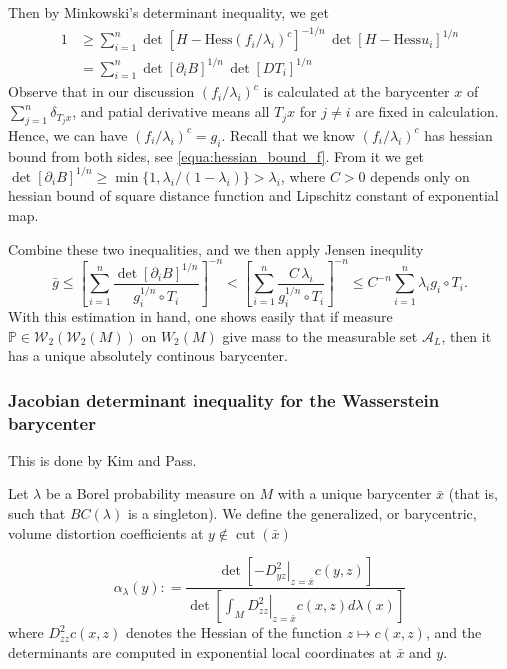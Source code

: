 Then by Minkowski's determinant inequality, we get
\begin{align*}
	1 & \geq \sum_{i=1}^{n} \det [H-\text{Hess}(f_i/\lambda_i)^c]^{-1/n}\,\det[H-\text{Hess}u_i]^{1/n} \\
	  & =\sum_{i=1}^n \det[\partial_i B]^{1/n}\,\det[DT_i]^{1/n}
\end{align*}
Observe that in our discussion $(f_i / \lambda_i)^c$ is calculated at the barycenter $x$ of $\sum_{j=1}^{n} \delta_{T_j x}$,
and patial derivative means all $T_j x$ for $ j \ne i$ are fixed in calculation.
Hence, we can have $(f_i / \lambda_i)^c = g_i$.
Recall that we know $(f_i / \lambda_i)^c$ has hessian bound from both sides, see \cref{equa:hessian_bound_f}.
From it we get $\det[\partial_i B]^{1/n} \geq \min \{1, \lambda_i / (1 - \lambda_i)\} > \lambda_i$,
where $C > 0$ depends only on hessian bound of square distance function and Lipschitz constant of exponential map.

Combine these two inequalities, and we then apply Jensen inequlity
\[
	\bar{g} \leq
	\left[ \sum_{i=1}^n \frac{\det[\partial_i B]^{1/n}}
	{g_i^{1/n} \circ T_i}\right]^{-n}
	< \left[ \sum_{i=1}^n \frac{C \, \lambda_i}
	{g_i^{1/n} \circ T_i}\right]^{-n}
	\leq C^{-n} \sum_{i=1}^n \lambda_i g_i \circ T_i.
\]
With this estimation in hand,
one shows easily that if measure $\mathbb{P} \in \mathcal{W}_2(\mathcal{W}_2(M))$ on $W_2(M)$ give mass to the measurable set $\mathcal{A}_L$,
then it has a unique absolutely continous barycenter.

\subsubsection{Jacobian determinant inequality for the Wasserstein barycenter}

This is done by Kim and Pass.
\begin{defn}
	Let \( \lambda \) be a Borel probability measure on \( M \) with a
	unique barycenter \( \bar { x } \) (that is, such that \( B C ( \lambda ) \) is a singleton). We define the generalized,
	or barycentric, volume distortion coefficients at \( y \notin \operatorname { cut } ( \bar { x } ) \)

	\[ \alpha _ { \lambda } ( y ) : = \frac { \operatorname { det } \left[ - \left. D _ { y z } ^ { 2 } \right| _ { z = \bar { x } } c ( y , z ) \right] } { \operatorname { det } \left[ \left. \int _ { M } D _ { z z } ^ { 2 } \right| _ { z = \bar { x } } c ( x , z ) d \lambda ( x ) \right] } \]
	where \( D _ { z z } ^ { 2 } c ( x , z ) \) denotes the Hessian of the function \( z \mapsto c ( x , z ) \), and the determinants
	are computed in exponential local coordinates at \( \bar { x } \) and \( y . \)
\end{defn}

